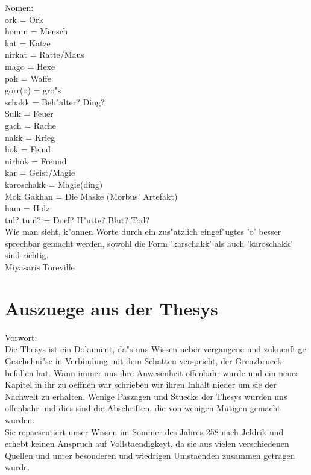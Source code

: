 \documentclass[a5paper,8pt]{book}
\begin{document}
\noindent Nomen: \\
ork = Ork\\ 
homm = Mensch\\
kat = Katze \\
nirkat = Ratte/Maus  \\
mago = Hexe \\
pak = Waffe\\
gorr(o) = gro"s \\
schakk = Beh"alter? Ding?\\
Sulk = Feuer \\
gach = Rache \\
nakk = Krieg \\
hok = Feind  \\
nirhok = Freund\\
kar = Geist/Magie\\ 
karoschakk = Magie(ding)\\
Mok Gakhan = Die Maske (Morbus' Artefakt)\\
ham = Holz \\
tul? tuul? = Dorf? H"utte? Blut? Tod? \\

\noindent Wie man sieht, k"onnen Worte durch ein zus"atzlich eingef"ugtes 'o' besser sprechbar gemacht werden, sowohl die Form 'karschakk' als auch 'karoschakk' sind richtig. \\
Miyasaris Toreville
\newpage

\section{ Auszuege aus der Thesys}

Vorwort:\\
Die Thesys ist ein Dokument, da"s uns Wissen ueber vergangene und zukuenftige Geschehni"se in Verbindung mit dem Schatten verspricht, der Grenzbrueck befallen hat. 
Wann immer uns ihre Anwesenheit offenbahr wurde und ein neues Kapitel in ihr zu oeffnen war schrieben wir ihren Inhalt nieder um sie der Nachwelt zu erhalten. 
Wenige Paszagen und Stuecke der Thesys wurden uns offenbahr und dies sind die Abschriften, die von wenigen Mutigen gemacht wurden.\\
Sie repaesentiert unser Wissen im Sommer des Jahres 258 nach Jeldrik und erhebt keinen Anspruch auf Vollstaendigkeyt, da sie aus vielen verschiedenen Quellen 
und unter besonderen und wiedrigen Umstaenden zusammen getragen wurde.
\newpage
\end{document}

